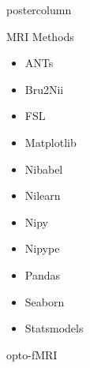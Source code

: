\documentclass{beamer}
\begin{document}
\begin{frame}
\begin{columns}
\begin{column}{.57\textwidth}
\begin{beamercolorbox}[center]{postercolumn}
\begin{minipage}{.98\textwidth}
{\begin{myblock}{MRI Methods}
\begin{center}
\begin{minipage}{.32\textwidth}
\begin{itemize}
\begin{multicols}{3}
\begin{itemize}
												\item ANTs
												\item Bru2Nii
												\item FSL
												\item Matplotlib
												\item Nibabel
												\item Nilearn
												\item Nipy
												\item Nipype
												\item Pandas
												\item Seaborn
												\item Statsmodels
											\end{itemize}
										\end{multicols}
								\end{itemize}
							\end{minipage}
						\end{center}
					\end{myblock}\vfill
					\begin{myblock}{opto-fMRI}
						\vspace{0.3em}
						\vspace{0.9em}
			
					\end{myblock}\vfill
		}\end{minipage}\end{beamercolorbox}
	\end{column}
\end{columns}
\end{frame}
\end{document}
